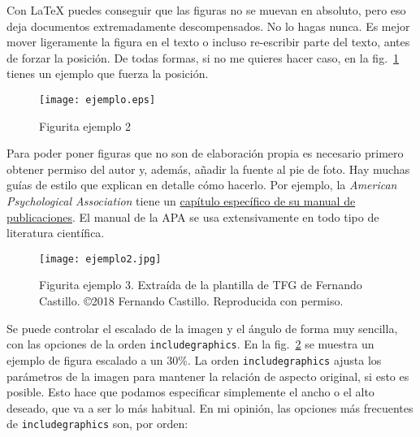 Con \LaTeX{} puedes conseguir que las figuras no se muevan en absoluto, pero eso deja documentos extremadamente descompensados.  No lo hagas nunca.  Es mejor mover ligeramente la figura en el texto o incluso re-escribir parte del texto, antes de forzar la posición.  De todas formas, si no me quieres hacer caso, en la fig.~\ref{fig:figurita-ejemplo-2}  tienes un ejemplo que fuerza la posición.

\begin{figure}[h!]
\centering
\texttt{[image: ejemplo.eps]}
\caption{Figurita ejemplo 2}
\label{fig:figurita-ejemplo-2}
\end{figure}

Para poder poner figuras que no son de elaboración propia es necesario primero obtener permiso del autor y, además, añadir la fuente al pie de foto. Hay muchas guías de estilo que explican en detalle cómo hacerlo. Por ejemplo, la \emph{American Psychological Association} tiene un \href{https://www.lib.sfu.ca/help/research-assistance/format-type/online-images/citing#citing-images-in-apa}{capítulo específico de su manual de publicaciones}.  El manual de la APA se usa extensivamente en todo tipo de literatura científica.

\begin{figure}[htb]
\centering
\texttt{[image: ejemplo2.jpg]}
\caption{Figurita ejemplo 3. Extraída de la plantilla de TFG de Fernando Castillo. \copyright 2018 Fernando Castillo. Reproducida con permiso.}
\label{fig:figura-ejemplo-3}
\end{figure}


Se puede controlar el escalado de la imagen y el ángulo de forma muy sencilla, con las opciones de la orden \texttt{includegraphics}.  En la fig.~\ref{fig:figura-ejemplo-3} se muestra un ejemplo de figura escalado a un 30\%.  La orden \texttt{includegraphics} ajusta los parámetros de la imagen para mantener la relación de aspecto original, si esto es posible.  Esto hace que podamos especificar simplemente el ancho o el alto deseado, que va a ser lo más habitual.  En mi opinión, las opciones más frecuentes de \texttt{includegraphics} son, por orden:


